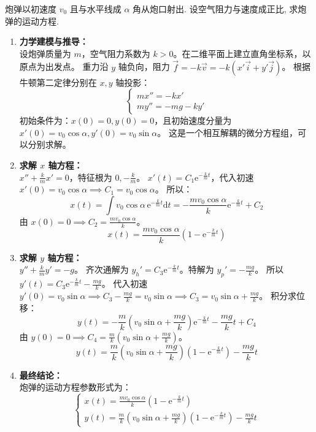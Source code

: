\documentclass[lang=cn,11pt]{elegantbook}
\begin{document}
\begin{exercise}
炮弹以初速度 $v_0$ 且与水平线成 $\alpha$ 角从炮口射出. 设空气阻力与速度成正比, 求炮弹的运动方程.
\end{exercise}
\begin{solution}
\begin{enumerate}
    \item \textbf{力学建模与推导：}\\
    设炮弹质量为 $m$，空气阻力系数为 $k > 0$。在二维平面上建立直角坐标系，以原点为出发点。
    重力沿 $y$ 轴负向，阻力 $\vec{f} = -k\vec{v} = -k(x'\vec{i} + y'\vec{j})$。
    根据牛顿第二定律分别在 $x, y$ 轴投影：
    \[
    \begin{cases}
    m x'' = -k x' \\
    m y'' = -mg - k y'
    \end{cases}
    \]
    初始条件为：$x(0)=0, y(0)=0$，且初始速度分量为 $x'(0) = v_0\cos\alpha, y'(0) = v_0\sin\alpha$。
    这是一个相互解耦的微分方程组，可以分别求解。

    \item \textbf{求解 $x$ 轴方程：}\\
    $x'' + \frac{k}{m}x' = 0$，特征根为 $0, -\frac{k}{m}$。
    $x'(t) = C_1\mathrm{e}^{-\frac{k}{m}t}$，代入初速 $x'(0) = v_0\cos\alpha \implies C_1 = v_0\cos\alpha$。
    所以：
    \[
    x(t) = \int v_0\cos\alpha\,\mathrm{e}^{-\frac{k}{m}t}\mathrm{d}t = -\frac{mv_0\cos\alpha}{k}\mathrm{e}^{-\frac{k}{m}t} + C_2
    \]
    由 $x(0) = 0 \implies C_2 = \frac{mv_0\cos\alpha}{k}$。
    \[
    x(t) = \frac{mv_0\cos\alpha}{k}\left(1 - \mathrm{e}^{-\frac{k}{m}t}\right)
    \]

    \item \textbf{求解 $y$ 轴方程：}\\
    $y'' + \frac{k}{m}y' = -g$。
    齐次通解为 $y_h' = C_3\mathrm{e}^{-\frac{k}{m}t}$。特解为 $y_p' = -\frac{mg}{k}$。
    所以 $y'(t) = C_3\mathrm{e}^{-\frac{k}{m}t} - \frac{mg}{k}$。
    代入初速 $y'(0) = v_0\sin\alpha \implies C_3 - \frac{mg}{k} = v_0\sin\alpha \implies C_3 = v_0\sin\alpha + \frac{mg}{k}$。
    积分求位移：
    \[
    y(t) = -\frac{m}{k}\left(v_0\sin\alpha + \frac{mg}{k}\right)\mathrm{e}^{-\frac{k}{m}t} - \frac{mg}{k}t + C_4
    \]
    由 $y(0) = 0 \implies C_4 = \frac{m}{k}\left(v_0\sin\alpha + \frac{mg}{k}\right)$。
    \[
    y(t) = \frac{m}{k}\left(v_0\sin\alpha + \frac{mg}{k}\right)\left(1 - \mathrm{e}^{-\frac{k}{m}t}\right) - \frac{mg}{k}t
    \]

    \item \textbf{最终结论：}\\
    炮弹的运动方程参数形式为：
    \[
    \boxed{
    \begin{cases}
    x(t) = \frac{m v_0 \cos\alpha}{k}\left(1 - \mathrm{e}^{-\frac{k}{m}t}\right) \\[6pt]
    y(t) = \frac{m}{k}\left(v_0 \sin\alpha + \frac{mg}{k}\right)\left(1 - \mathrm{e}^{-\frac{k}{m}t}\right) - \frac{mg}{k}t
    \end{cases}
    }
    \]
\end{enumerate}
\end{solution}
\end{document}

